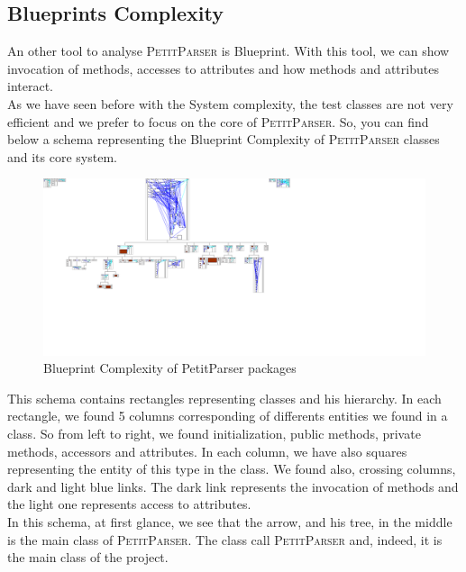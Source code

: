 \subsection{Blueprints Complexity}
An other tool to analyse \textsc{PetitParser} is Blueprint.  With this tool, we can show invocation of methods, accesses to attributes and how methods and attributes interact.\\
As we have seen before with the System complexity, the test classes are not very efficient and we prefer to focus on the core of \textsc{PetitParser}.  So, you can find below a schema representing the Blueprint Complexity of \textsc{PetitParser} classes and its core system.\\
\begin{figure}[ht]
\label{blueprint_system}
\includegraphics[scale=0.35]{blueprint_petit_parser.png}
\caption{Blueprint Complexity of PetitParser packages}
\end{figure}
This schema contains rectangles representing classes and his hierarchy.  In each rectangle, we found 5 columns corresponding of differents entities we found in a class.  So from left to right, we found initialization, public methods, private methods, accessors and attributes.  In each column, we have also squares representing the entity of this type in the class.  We found also, crossing columns, dark and light blue links.  The dark link represents the invocation of methods and the light one represents access to attributes.\\
In this schema, at first glance, we see that the arrow, and his tree, in the middle is the main class of \textsc{PetitParser}.  The class call \textsc{PetitParser} and, indeed, it is the main class of the project. \\

